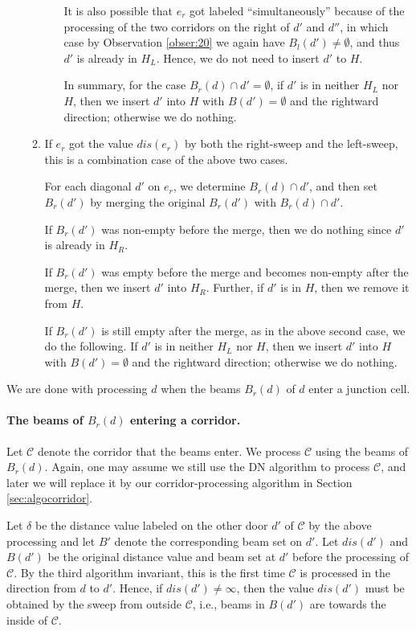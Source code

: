 \documentclass[english,runningheads,11pt]{llncs-revised}
\def\calC{\mathcal{C}}
\begin{document}
\begin{enumerate}
\begin{enumerate}
\begin{itemize}
It is also possible that $e_r$ got labeled ``simultaneously'' because
of the processing of the two corridors on the right of $d'$ and $d''$,
in which case by Observation \ref{obser:20} we again have $B_l(d')\neq
\emptyset$, and thus $d'$ is already in $H_L$. Hence, we do not need to insert $d'$ to $H$.

In summary, for the case $B_r(d)\cap d'=\emptyset$,  if $d'$ is in
neither $H_L$ nor $H$, then we insert $d'$ into $H$ with
$B(d')=\emptyset$ and the rightward direction; otherwise we do
nothing.

\end{itemize}

\item
If $e_r$ got the value $dis(e_r)$ by both the right-sweep and the
left-sweep, this is a combination case of the above two cases.

For each diagonal $d'$ on $e_r$, we determine $B_r(d)\cap d'$, and
then set $B_r(d')$ by merging the original $B_r(d')$ with $B_r(d)\cap
d'$.

If $B_r(d')$ was non-empty before the merge, then we do nothing since
$d'$ is already in $H_R$.

If $B_r(d')$ was empty before the merge and becomes non-empty
after the merge, then we insert $d'$ into $H_R$. Further, if $d'$ is
in $H$, then we remove it from $H$.

If $B_r(d')$ is still empty after the merge, as in the above second
case, we do the following. If $d'$ is in neither
$H_L$ nor $H$, then we insert $d'$ into $H$ with
$B(d')=\emptyset$ and the rightward direction; otherwise we do
nothing.
\end{enumerate}
\end{enumerate}

We are done with processing $d$ when the beams $B_r(d)$ of $d$ enter
a junction cell.

\paragraph{The beams of $B_r(d)$ entering a corridor.}
Let $\calC$ denote the corridor that the beams enter.
We process $\calC$ using the beams of $B_r(d)$.
Again, one may assume we still use the DN algorithm to process $\calC$,
and later we will replace it by our corridor-processing
algorithm in Section \ref{sec:algocorridor}.

Let $\delta$ be the distance value labeled on the other door $d'$ of $\calC$
by the above processing and let $B'$ denote the corresponding beam set
on $d'$. Let $dis(d')$ and $B(d')$ be the original distance
value and beam set at $d'$ before the processing of $\calC$.
By the third algorithm invariant, this is the first time $\calC$ is processed in the direction from $d$ to $d'$. Hence, if $dis(d')\neq\infty$, then the value $dis(d')$ must be obtained by the sweep
from outside $\calC$, i.e., beams in $B(d')$ are towards the inside of $\calC$.
\end{document}
